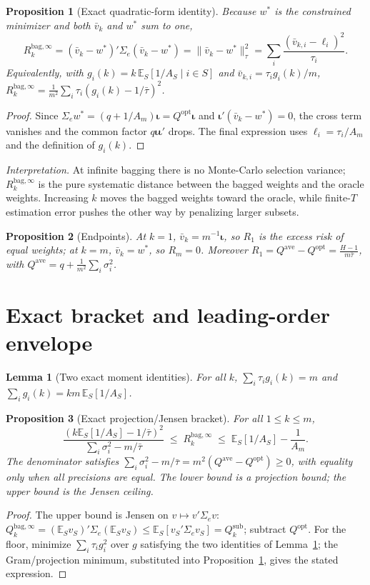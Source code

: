 \documentclass[11pt]{article}
\newcommand{\E}{\mathbb{E}}
\newcommand{\Sig}{\Sigma_e}
\newcommand{\Rbag}{R_k^{\mathrm{bag},\infty}}
\newcommand{\Qbag}{Q_k^{\mathrm{bag},\infty}}
\newcommand{\Qopt}{Q^{\mathrm{opt}}}
\newcommand{\Qave}{Q^{\mathrm{ave}}}
\newcommand{\Qsub}{Q_k^{\mathrm{sub}}}
\newcommand{\iotab}{\bm{\iota}}
\newtheorem{lemma}{Lemma}
\newtheorem{proposition}{Proposition}
\begin{document}
\begin{proposition}[Exact quadratic-form identity]\label{prop:identity}
Because $w^\ast$ is the constrained minimizer and both $\bar v_k$ and $w^\ast$ sum to one,
\[
  \Rbag=(\bar v_k-w^\ast)'\Sig(\bar v_k-w^\ast)=\|\bar v_k-w^\ast\|_\tau^2
  =\sum_i\frac{(\bar v_{k,i}-\ell_i)^2}{\tau_i}.
\]
Equivalently, with $g_i(k)=k\,\E_S[1/A_S\mid i\in S]$ and $\bar v_{k,i}=\tau_ig_i(k)/m$,
$\Rbag=\frac1{m^2}\sum_i\tau_i(g_i(k)-1/\bar\tau)^2$.
\end{proposition}
\begin{proof}
Since $\Sig w^\ast=(q+1/A_m)\iotab=\Qopt\iotab$ and $\iotab'(\bar v_k-w^\ast)=0$, the cross
term vanishes and the common factor $q\iotab\iotab'$ drops. The final expression uses
$\ell_i=\tau_i/A_m$ and the definition of $g_i(k)$.
\end{proof}

\noindent\emph{Interpretation.} At infinite bagging there is no Monte-Carlo selection
variance; $\Rbag$ is the pure systematic distance between the bagged weights and the oracle
weights. Increasing $k$ moves the bagged weights toward the oracle, while finite-$T$
estimation error pushes the other way by penalizing larger subsets.

\begin{proposition}[Endpoints]
At $k=1$, $\bar v_k=m^{-1}\iotab$, so $R_1$ is the excess risk of equal weights; at $k=m$,
$\bar v_k=w^\ast$, so $R_m=0$. Moreover $R_1=\Qave-\Qopt=\frac{H-1}{m\bar\tau}$, with
$\Qave=q+\frac1{m^2}\sum_i\sigma_i^2$.
\end{proposition}

\section{Exact bracket and leading-order envelope}
\begin{lemma}[Two exact moment identities]\label{lem:moments}
For all $k$, $\sum_i\tau_ig_i(k)=m$ and $\sum_ig_i(k)=km\,\E_S[1/A_S]$.
\end{lemma}

\begin{proposition}[Exact projection/Jensen bracket]\label{prop:bracket}
For all $1\le k\le m$,
\[
  \frac{(k\E_S[1/A_S]-1/\bar\tau)^2}{\sum_i\sigma_i^2-m/\bar\tau}\;\le\;\Rbag\;\le\;
  \E_S[1/A_S]-\frac1{A_m}.
\]
The denominator satisfies $\sum_i\sigma_i^2-m/\bar\tau=m^2(\Qave-\Qopt)\ge0$, with equality
only when all precisions are equal. The lower bound is a projection bound; the upper bound is
the Jensen ceiling.
\end{proposition}
\begin{proof}
The upper bound is Jensen on $v\mapsto v'\Sig v$: $\Qbag=(\E_Sv_S)'\Sig(\E_Sv_S)\le
\E_S[v_S'\Sig v_S]=\Qsub$; subtract $\Qopt$. For the floor, minimize $\sum_i\tau_ig_i^2$ over
$g$ satisfying the two identities of Lemma~\ref{lem:moments}; the Gram/projection minimum,
substituted into Proposition~\ref{prop:identity}, gives the stated expression.
\end{proof}
\end{document}
